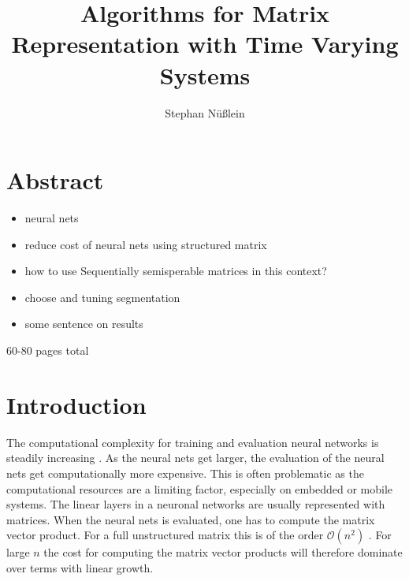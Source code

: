 \documentclass[doctype=mastersthesis,BCOR=15mm,biblatex]{ldvbook}%
\newcommand{\bigO}{\mathscr{O}}
\begin{document}
\title{Algorithms for Matrix Representation with Time Varying Systems}
%
\author{Stephan Nüßlein}


\maketitle[frontcover=Design1]


\chapter*{Abstract}

\begin{itemize}
	\item neural nets
	\item reduce cost of neural nets using structured matrix
	\item how to use Sequentially semisperable matrices in this context?
	\item choose and tuning segmentation
	\item some sentence on results
\end{itemize}


\tableofcontents

60-80 pages total







\chapter{Introduction} 

The computational complexity for training and evaluation neural networks is steadily increasing \cite{Schwartz_green_2020}.
As the neural nets get larger, the evaluation of the neural nets get computationally more expensive. This is often problematic as the computational resources are a limiting factor, especially on embedded or mobile systems.
The linear layers in a neuronal networks are usually represented with matrices.
When the neural nets is evaluated, one has to compute the matrix vector product.
For a full unstructured matrix this is of the order $\bigO(n^2)$ \cite{hackbusch_hierarchische_2009}.
For large $n$ the cost for computing the matrix vector products will therefore dominate over terms with linear growth.
\end{document}
